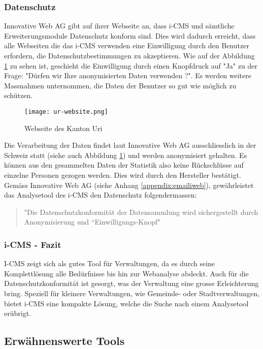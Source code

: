 \subsubsection{Datenschutz}
Innovative Web AG gibt auf ihrer Webseite \parencite{iwebwebsiteKanotonWeb} an, dass i-CMS und sämtliche Erweiterungsmodule Datenschutz konform sind. Dies wird dadurch erreicht, dass alle Webseiten die das i-CMS verwenden eine Einwilligung durch den Benutzer erfordern, die Datenschutzbestimmungen zu akzeptieren. Wie auf der Abbildung \ref{fig: urweb} zu sehen ist, geschieht die Einwilligung durch einen Knopfdruck auf "Ja" zu der Frage: "Dürfen wir Ihre anonymisierten Daten verwenden ?". Es werden weitere Massnahmen unternommen, die Daten der Benutzer so gut wie möglich zu schützen.

\begin{figure}[h]
  \centering
  \texttt{[image: ur-website.png]}
  \caption{Webseite des Kanton Uri \parencite{webseiteKantonUri}}
  \label{fig: urweb}
\end{figure}

Die Verarbeitung der Daten findet laut Innovative Web AG \parencite{iwebwebsiteCMS} ausschliesslich in der Schweiz statt (siehe auch Abbildung \ref{fig: urweb}) und werden anonymisiert gehalten. Es können aus den gesammelten Daten der Statistik also keine Rückschlüsse auf einzelne Personen gezogen werden. Dies wird durch den Hersteller bestätigt. Gemäss Innovative Web AG (siehe Anhang \ref{appendix:emailiweb}), gewährleistet das Analysetool des i-CMS den Datenschutz folgendermassen:

\begin{quote}
  "Die Datenschutzkonformität der Datensammlung wird sichergestellt durch Anonymisierung und “Einwilligungs-Knopf"
\end{quote}

\subsubsection{i-CMS - Fazit}

I-CMS zeigt sich als gutes Tool für Verwaltungen, da es durch seine Komplettlösung alle Bedürfnisse bis hin zur Webanalyse abdeckt. Auch für die Datenschutzkonformität ist gesorgt, was der Verwaltung eine grosse Erleichterung bring. Speziell für kleinere Verwaltungen, wie Gemeinde- oder Stadtverwaltungen, bietet i-CMS eine kompakte Lösung, welche die Suche nach einem Analysetool erübrigt. 

\subsection{Erwähnenswerte Tools}

